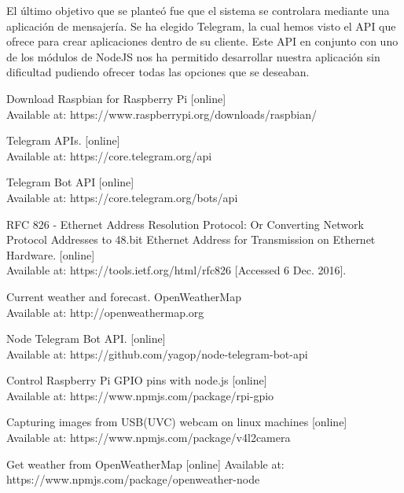 \documentclass[10pt,journal,compsoc]{IEEEtran}
\begin{document}
El último objetivo que se planteó fue que el sistema se controlara mediante 
una aplicación de mensajería. Se ha elegido Telegram, la cual hemos visto el API 
que ofrece para crear aplicaciones dentro de su cliente. Este API en conjunto 
con uno de los módulos de NodeJS nos ha permitido desarrollar nuestra aplicación 
sin dificultad pudiendo ofrecer todas las opciones que se deseaban.

\begin{thebibliography}{1}

Download Raspbian for Raspberry Pi [online] \\
Available at: https://www.raspberrypi.org/downloads/raspbian/

Telegram APIs. [online]  \\
Available at: https://core.telegram.org/api

Telegram Bot API [online] \\ 
Available at: https://core.telegram.org/bots/api

RFC 826 - Ethernet Address Resolution Protocol: Or Converting Network Protocol 
Addresses to 48.bit Ethernet Address for Transmission on Ethernet Hardware. [online] \\
Available at: https://tools.ietf.org/html/rfc826 [Accessed 6 Dec. 2016].

Current weather and forecast. OpenWeatherMap \\
Available at: http://openweathermap.org

Node Telegram Bot API. [online] \\
Available at: https://github.com/yagop/node-telegram-bot-api

Control Raspberry Pi GPIO pins with node.js [online] \\
Available at: https://www.npmjs.com/package/rpi-gpio

Capturing images from USB(UVC) webcam on linux machines [online] \\
Available at: https://www.npmjs.com/package/v4l2camera

Get weather from OpenWeatherMap [online]
Available at: https://www.npmjs.com/package/openweather-node

\end{thebibliography}
\end{document}
